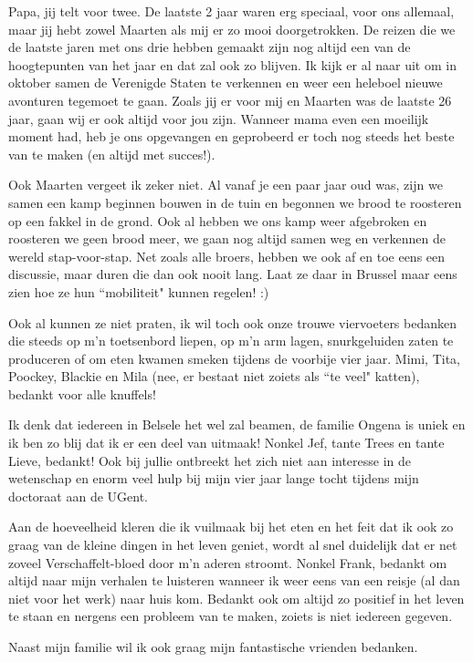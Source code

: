 Papa, jij telt voor twee.
De laatste 2 jaar waren erg speciaal, voor ons allemaal, maar jij hebt zowel Maarten als mij er zo mooi doorgetrokken.
De reizen die we de laatste jaren met ons drie hebben gemaakt zijn nog altijd een van de hoogtepunten van het jaar en dat zal ook zo blijven.
Ik kijk er al naar uit om in oktober samen de Verenigde Staten te verkennen en weer een heleboel nieuwe avonturen tegemoet te gaan.
Zoals jij er voor mij en Maarten was de laatste 26 jaar, gaan wij er ook altijd voor jou zijn.
Wanneer mama even een moeilijk moment had, heb je ons opgevangen en geprobeerd er toch nog steeds het beste van te maken (en altijd met succes!).

Ook Maarten vergeet ik zeker niet.
Al vanaf je een paar jaar oud was, zijn we samen een kamp beginnen bouwen in de tuin en begonnen we brood te roosteren op een fakkel in de grond.
Ook al hebben we ons kamp weer afgebroken en roosteren we geen brood meer, we gaan nog altijd samen weg en verkennen de wereld stap-voor-stap.
Net zoals alle broers, hebben we ook af en toe eens een discussie, maar duren die dan ook nooit lang.
Laat ze daar in Brussel maar eens zien hoe ze hun ``mobiliteit" kunnen regelen! :)

Ook al kunnen ze niet praten, ik wil toch ook onze trouwe viervoeters bedanken die steeds op m'n toetsenbord liepen, op m'n arm lagen, snurkgeluiden zaten te produceren of om eten kwamen smeken tijdens de voorbije vier jaar.
Mimi, Tita, Poockey, Blackie en Mila (nee, er bestaat niet zoiets als ``te veel" katten), bedankt voor alle knuffels!

Ik denk dat iedereen in Belsele het wel zal beamen, de familie Ongena is uniek en ik ben zo blij dat ik er een deel van uitmaak!
Nonkel Jef, tante Trees en tante Lieve, bedankt!
Ook bij jullie ontbreekt het zich niet aan interesse in de wetenschap en enorm veel hulp bij mijn vier jaar lange tocht tijdens mijn doctoraat aan de UGent.

Aan de hoeveelheid kleren die ik vuilmaak bij het eten en het feit dat ik ook zo graag van de kleine dingen in het leven geniet, wordt al snel duidelijk dat er net zoveel Verschaffelt-bloed door m'n aderen stroomt.
Nonkel Frank, bedankt om altijd naar mijn verhalen te luisteren wanneer ik weer eens van een reisje (al dan niet voor het werk) naar huis kom.
Bedankt ook om altijd zo positief in het leven te staan en nergens een probleem van te maken, zoiets is niet iedereen gegeven.

Naast mijn familie wil ik ook graag mijn fantastische vrienden bedanken.


